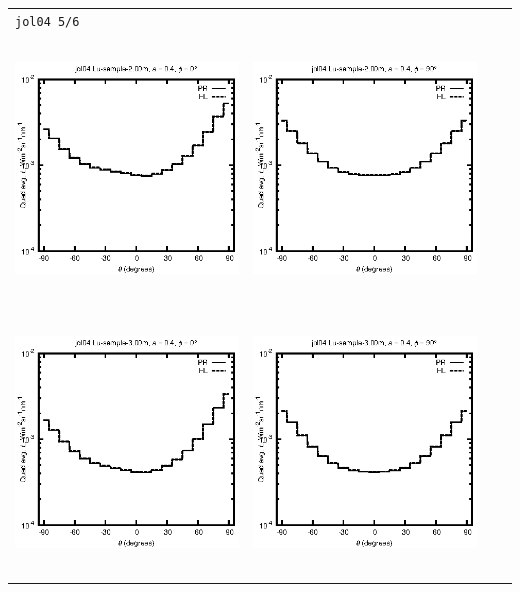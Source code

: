 \begin{tabular}{c c c c}
\multicolumn{4}{l}{\texttt{jol04 5/6}} \\
\includegraphics[height=7cm]{../eps/jol04_Lu_sample_2.00m_fwd.eps} &
\includegraphics[height=7cm]{../eps/jol04_Lu_sample_2.00m_cross.eps} \\
\includegraphics[height=7cm]{../eps/jol04_Lu_sample_3.00m_fwd.eps} &
\includegraphics[height=7cm]{../eps/jol04_Lu_sample_3.00m_cross.eps} \\

\end{tabular}
